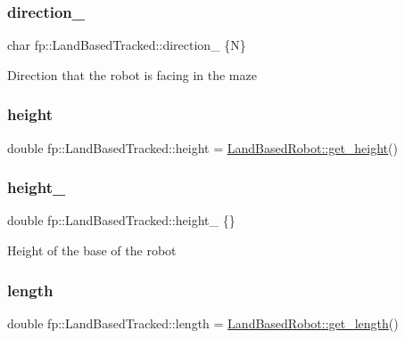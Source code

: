 \subsubsection{\texorpdfstring{direction\+\_\+}{direction\_}}
{\footnotesize\ttfamily char fp\+::\+Land\+Based\+Tracked\+::direction\+\_\+ \{\textquotesingle{}N\textquotesingle{}\}\hspace{0.3cm}{\ttfamily [protected]}}

Direction that the robot is facing in the maze \mbox{\label{classfp_1_1_land_based_tracked_a23bbcb88d1b14513c786017dc1ceee66}} 
\subsubsection{\texorpdfstring{height}{height}}
{\footnotesize\ttfamily double fp\+::\+Land\+Based\+Tracked\+::height = \hyperlink{classfp_1_1_land_based_robot_ac77253c989c417ee26654541c50669d4}{Land\+Based\+Robot\+::get\+\_\+height}()}

\mbox{\label{classfp_1_1_land_based_tracked_a5f9e0d15ade5738525ccef9d8899a1b2}} 
\subsubsection{\texorpdfstring{height\+\_\+}{height\_}}
{\footnotesize\ttfamily double fp\+::\+Land\+Based\+Tracked\+::height\+\_\+ \{\}\hspace{0.3cm}{\ttfamily [protected]}}

Height of the base of the robot \mbox{\label{classfp_1_1_land_based_tracked_a5c81a68468defb336f0c207069290cc2}} 
\subsubsection{\texorpdfstring{length}{length}}
{\footnotesize\ttfamily double fp\+::\+Land\+Based\+Tracked\+::length = \hyperlink{classfp_1_1_land_based_robot_adb03fbded9a3b0553301bcc0322cb1c1}{Land\+Based\+Robot\+::get\+\_\+length}()}

